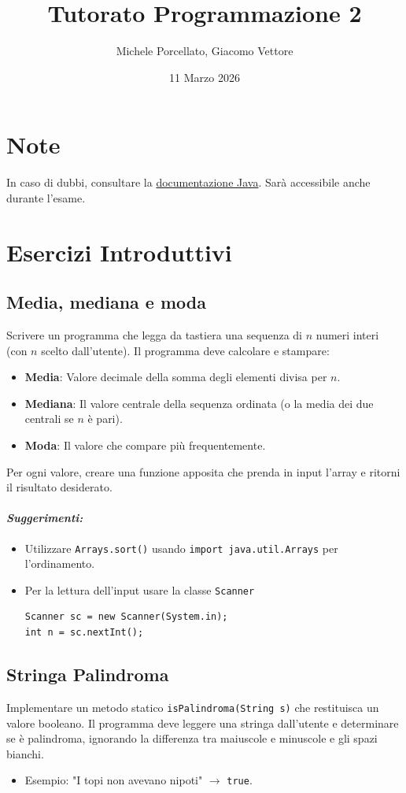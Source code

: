 \documentclass{article}
\title{Tutorato Programmazione 2}
\author{Michele Porcellato, Giacomo Vettore}
\date{11 Marzo 2026}
\begin{document}
\maketitle

\section{Note}
In caso di dubbi, consultare la \href{https://docs.oracle.com/en/java/javase/25/docs/api/index.html}{documentazione Java}. Sarà accessibile anche durante l'esame.

\section{Esercizi Introduttivi}
\subsection{Media, mediana e moda}
Scrivere un programma che legga da tastiera una sequenza di $n$ numeri interi (con $n$ scelto dall'utente). Il programma deve calcolare e stampare:
\begin{itemize}
    \item \textbf{Media}: Valore decimale della somma degli elementi divisa per $n$.
    \item \textbf{Mediana}: Il valore centrale della sequenza ordinata (o la media dei due centrali se $n$ è pari).
    \item \textbf{Moda}: Il valore che compare più frequentemente.
\end{itemize}
Per ogni valore, creare una funzione apposita che prenda in input l'array e ritorni il risultato desiderato.
\paragraph{\textit{Suggerimenti:}}
\begin{itemize}
    \item Utilizzare \texttt{Arrays.sort()} usando \texttt{import java.util.Arrays} per l'ordinamento.
    \item Per la lettura dell'input usare la classe \texttt{Scanner}
    \begin{verbatim}
Scanner sc = new Scanner(System.in);
int n = sc.nextInt(); 
    \end{verbatim}
\end{itemize}

\subsection{Stringa Palindroma}
Implementare un metodo statico \texttt{isPalindroma(String s)} che restituisca un valore booleano. Il programma deve leggere una stringa dall'utente e determinare se è palindroma, ignorando la differenza tra maiuscole e minuscole e gli spazi bianchi.
\begin{itemize}
    \item Esempio: "I topi non avevano nipoti" $\rightarrow$ \texttt{true}.
\end{itemize}
\end{document}
